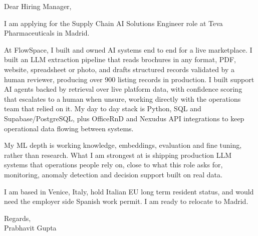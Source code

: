 \documentclass[a4paper,11pt]{article}
\begin{document}
Dear Hiring Manager,

I am applying for the Supply Chain AI Solutions Engineer role at Teva Pharmaceuticals in Madrid.

At FlowSpace, I built and owned AI systems end to end for a live marketplace. I built an LLM extraction pipeline that reads brochures in any format, PDF, website, spreadsheet or photo, and drafts structured records validated by a human reviewer, producing over 900 listing records in production. I built support AI agents backed by retrieval over live platform data, with confidence scoring that escalates to a human when unsure, working directly with the operations team that relied on it. My day to day stack is Python, SQL and Supabase/PostgreSQL, plus OfficeRnD and Nexudus API integrations to keep operational data flowing between systems.

My ML depth is working knowledge, embeddings, evaluation and fine tuning, rather than research. What I am strongest at is shipping production LLM systems that operations people rely on, close to what this role asks for, monitoring, anomaly detection and decision support built on real data.

I am based in Venice, Italy, hold Italian EU long term resident status, and would need the employer side Spanish work permit. I am ready to relocate to Madrid.

Regards,\\
Prabhavit Gupta
\end{document}
